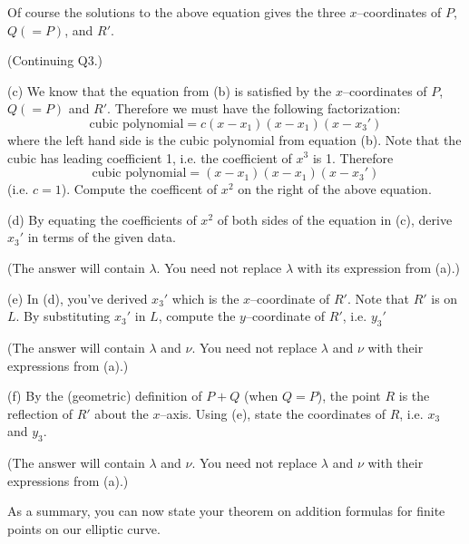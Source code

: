 \documentclass[a4paper,12pt]{article}
\begin{document}
Of course the solutions to the above equation
gives the three $x$--coordinates
of $P$, $Q (=P)$, and $R'$.

\SOLUTION



\newpage

(Continuing Q3.)

(c) We know that the equation from (b) is satisfied by 
the $x$--coordinates of $P$, $Q (= P)$ and $R'$.
Therefore we must have the following factorization:
\[
\text{cubic polynomial} = c(x - x_1) (x - x_1) (x - x_3')
\]
where the left hand side is the cubic polynomial from equation (b).
Note that the cubic has leading coefficient 1, i.e. the coefficient
of $x^3$ is 1. Therefore
\[
\text{cubic polynomial}  = (x - x_1) (x - x_1) (x - x_3')
\]
(i.e. $c = 1$).
Compute the coefficent of $x^2$ on the right of the above equation.

\SOLUTION



\newpage

(d) By equating the coefficients of $x^2$ of both sides of
the equation in (c), derive $x_3'$ in terms of the 
given data.

(The answer will contain $\lambda$. You need not replace
$\lambda$ with its expression from (a).)

\SOLUTION
 


\newpage

(e) In (d), you've derived $x_3'$ which is the $x$--coordinate of $R'$.
Note that $R'$ is on $L$. By substituting $x_3'$ in $L$, compute
the $y$--coordinate of $R'$, i.e. $y_3'$

(The answer will contain $\lambda$ and $\nu$. You need not replace
$\lambda$ and $\nu$ with their expressions from (a).)
 
\SOLUTION



\newpage

(f) By the (geometric) definition of $P + Q$ (when $Q = P$), 
the point $R$ is the reflection of $R'$ about the $x$--axis.
Using (e), state the coordinates of $R$, i.e. $x_3$ and $y_3$.

(The answer will contain $\lambda$ and $\nu$. You need not replace
$\lambda$ and $\nu$ with their expressions from (a).)




\newpage

As a summary, you can now state your theorem on 
addition formulas for 
finite points on our elliptic curve.
\end{document}
